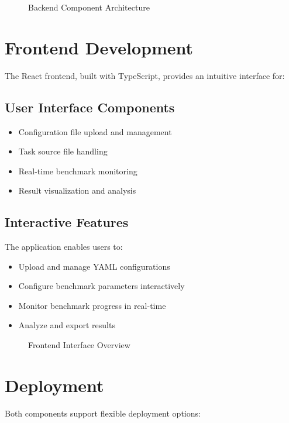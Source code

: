 \begin{figure}[h]
    \centering
    \caption{Backend Component Architecture}
    \label{fig:backend-arch}
\end{figure}

\section{Frontend Development}

The React frontend, built with TypeScript, provides an intuitive interface for:

\subsection{User Interface Components}
\begin{itemize}
    \item Configuration file upload and management
    \item Task source file handling
    \item Real-time benchmark monitoring
    \item Result visualization and analysis
\end{itemize}

\subsection{Interactive Features}
The application enables users to:
\begin{itemize}
    \item Upload and manage YAML configurations
    \item Configure benchmark parameters interactively
    \item Monitor benchmark progress in real-time
    \item Analyze and export results
\end{itemize}

\begin{figure}[h]
    \centering
    \caption{Frontend Interface Overview}
    \label{fig:frontend-ui}
\end{figure}

\section{Deployment}

Both components support flexible deployment options:

